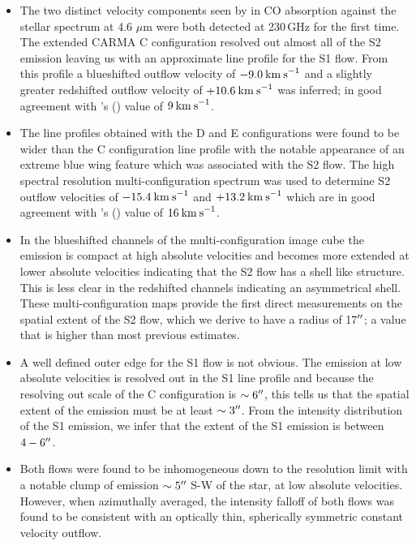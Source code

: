 \begin{itemize}

\item The two distinct velocity components seen by \cite{bernat_1979} in CO absorption against the stellar spectrum at 4.6 $\mu$m were both detected at 230\,GHz for the first time. The extended CARMA C configuration resolved out almost all of the S2 emission leaving us with an approximate line profile for the S1 flow. From this profile a blueshifted outflow velocity of $-9.0\>{\rm km\>s}^{-1}$ and a slightly greater redshifted outflow velocity of $+10.6\>{\rm km\>s}^{-1}$ was inferred; in good agreement with \citeauthor{bernat_1979}'s (\citeyear{bernat_1979})  value of $9\>{\rm km\>s}^{-1}$.  

\item The line profiles obtained with the D and E configurations were found to be wider than the C configuration line profile with the notable appearance of an extreme blue wing feature which was associated with the S2 flow. The high spectral resolution multi-configuration spectrum was used to determine S2 outflow velocities of $-15.4\>{\rm km\>s}^{-1}$ and $+13.2\>{\rm km\>s}^{-1}$ which are in good agreement with \citeauthor{bernat_1979}'s (\citeyear{bernat_1979})  value of $16\>{\rm km\>s}^{-1}$.  

\item In the blueshifted channels of the  multi-configuration image cube the emission is compact at high absolute velocities and becomes more extended at lower absolute velocities indicating that the S2 flow has a shell like structure. This is less clear in the redshifted channels indicating an asymmetrical shell. These multi-configuration maps provide the first direct measurements on the spatial extent of the S2 flow, which we derive to have a radius of 17$^{\prime\prime}$; a value that is higher than most previous estimates. 

\item A well defined outer edge for the S1 flow is not obvious. The emission at low absolute velocities is resolved out in the S1 line profile and because the resolving out scale of the C configuration is $\sim 6^{\prime\prime}$, this tells us that the spatial extent of the emission must be at least $\sim 3^{\prime\prime}$. From the intensity distribution of the S1 emission, we infer that the extent of the S1 emission is between $4-6^{\prime\prime}$.

\item Both flows were found to be inhomogeneous down to the resolution limit with a notable clump of emission $\sim 5^{\prime\prime}$ S-W of the star, at low absolute velocities. However, when azimuthally averaged, the intensity falloff of both flows was found to be consistent with an optically thin, spherically symmetric constant velocity outflow.


\end{itemize}
